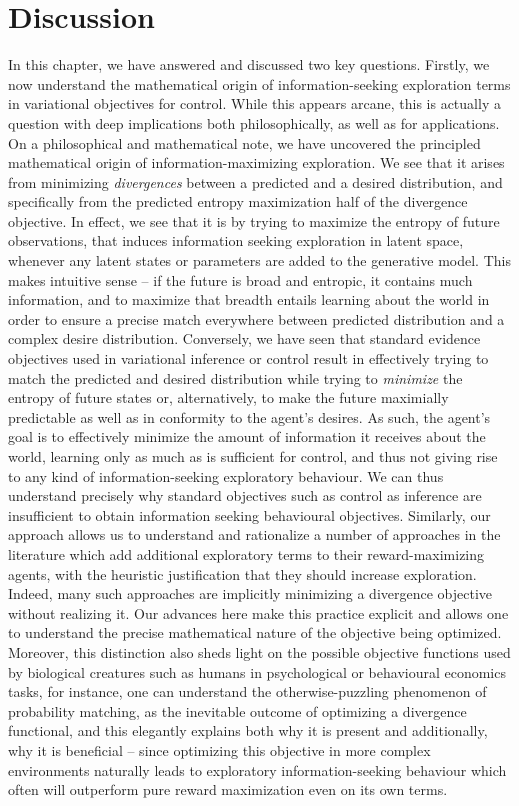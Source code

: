 \section{Discussion}

In this chapter, we have answered and discussed two key questions. Firstly, we now understand the mathematical origin of information-seeking exploration terms in variational objectives for control. While this appears arcane, this is actually a question with deep implications both philosophically, as well as for applications. On a philosophical and mathematical note, we have uncovered the principled mathematical origin of information-maximizing exploration. We see that it arises from minimizing \emph{divergences} between a predicted and a desired distribution, and specifically from the predicted entropy maximization half of the divergence objective. In effect, we see that it is by trying to maximize the entropy of future observations, that induces information seeking exploration in latent space, whenever any latent states or parameters are added to the generative model. This makes intuitive sense -- if the future is broad and entropic, it contains much information, and to maximize that breadth entails learning about the world in order to ensure a precise match everywhere between predicted distribution and a complex desire distribution. Conversely, we have seen that standard evidence objectives used in variational inference or control result in effectively trying to match the predicted and desired distribution while trying to \emph{minimize} the entropy of future states or, alternatively, to make the future maximially predictable as well as in conformity to the agent's desires. As such, the agent's goal is to effectively minimize the amount of information it receives about the world, learning only as much as is sufficient for control, and thus not giving rise to any kind of information-seeking exploratory behaviour. We can thus understand precisely why standard objectives such as control as inference are insufficient to obtain information seeking behavioural objectives. Similarly, our approach allows us to understand and rationalize a number of approaches in the literature \citep{sun_planning_2011,oudeyer2009intrinsic,klyubin2005empowerment} which add additional exploratory terms to their reward-maximizing agents, with the heuristic justification that they should increase exploration. Indeed, many such approaches are implicitly minimizing a divergence objective without realizing it. Our advances here make this practice explicit and allows one to understand the precise mathematical nature of the objective being optimized. Moreover, this distinction also sheds light on the possible objective functions used by biological creatures such as humans in psychological or behavioural economics tasks, for instance, one can understand the otherwise-puzzling phenomenon of probability matching, as the inevitable outcome of optimizing a divergence functional, and this elegantly explains both why it is present and additionally, why it is beneficial -- since optimizing this objective in more complex environments naturally leads to exploratory information-seeking behaviour which often will outperform pure reward maximization even on its own terms.

